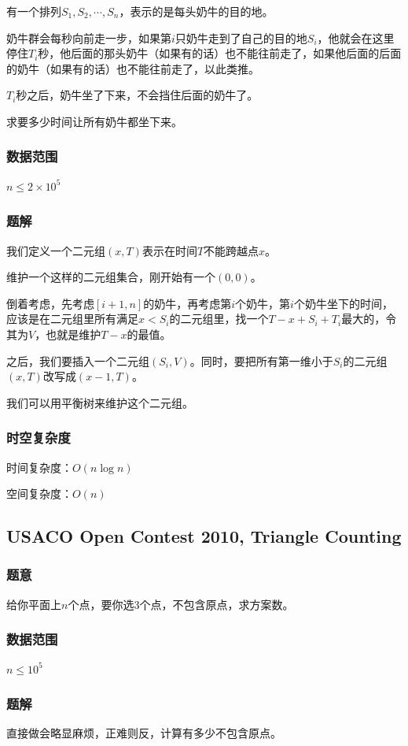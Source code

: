 \documentclass{ctexart}
\begin{document}
有一个排列$S_1,S_2,\cdots,S_n$，表示的是每头奶牛的目的地。

奶牛群会每秒向前走一步，如果第$i$只奶牛走到了自己的目的地$S_i$，他就会在这里停住$T_i$秒，他后面的那头奶牛（如果有的话）也不能往前走了，如果他后面的后面的奶牛（如果有的话）也不能往前走了，以此类推。

$T_i$秒之后，奶牛坐了下来，不会挡住后面的奶牛了。

求要多少时间让所有奶牛都坐下来。
\subsubsection{数据范围}
$n \le 2\times 10^5$
\subsubsection{题解}
我们定义一个二元组$(x,T)$表示在时间$T$不能跨越点$x$。

维护一个这样的二元组集合，刚开始有一个$(0,0)$。

倒着考虑，先考虑$[i+1,n]$的奶牛，再考虑第$i$个奶牛，第$i$个奶牛坐下的时间，应该是在二元组里所有满足$x<S_i$的二元组里，找一个$T-x+S_i+T_i$最大的，令其为$V$，也就是维护$T-x$的最值。

之后，我们要插入一个二元组$(S_i,V)$。同时，要把所有第一维小于$S_i$的二元组$(x,T)$改写成$(x-1,T)$。

我们可以用平衡树来维护这个二元组。
\subsubsection{时空复杂度}
时间复杂度：$O(n \log n)$

空间复杂度：$O(n)$
\subsection{USACO Open Contest 2010, Triangle Counting}
\subsubsection{题意}
给你平面上$n$个点，要你选$3$个点，不包含原点，求方案数。
\subsubsection{数据范围}
$n \le 10^5$
\subsubsection{题解}
直接做会略显麻烦，正难则反，计算有多少不包含原点。
\end{document}

